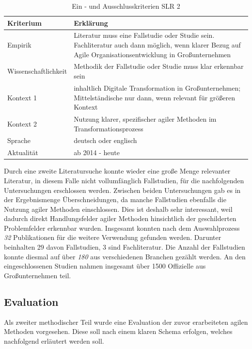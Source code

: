 \begin{table}[ht]
	\centering
	\caption{Ein - und Ausschlusskriterien SLR 2}
	\begin{tabular}{|p{4cm}|p{8cm}|}
		\hline
		\textbf{Kriterium}& \textbf{Erklärung}  \\
		\hline
		Empirik & Literatur muss eine Fallstudie oder Studie sein. Fachliteratur auch dann möglich, wenn klarer Bezug auf Agile Organisationsentwicklung in Großunternehmen \\
		Wissenschaftlichkeit & Methodik der  Fallstudie oder Studie muss klar erkennbar sein \\
		Kontext 1 & inhaltlich Digitale Transformation in Großunternehmen; Mittelständische nur dann, wenn relevant für größeren Kontext \\
		Kontext 2 & Nutzung klarer, spezifischer agiler Methoden im Transformationsprozess \\
		Sprache & deutsch oder englisch \\
		Aktualität & ab 2014 - heute  \\
		\hline
	\end{tabular}
	\label{tab:criteriaslr2}
\end{table}

Durch eine zweite Literatursuche konnte wieder eine große Menge relevanter Literatur, in diesem Falle nicht vollumfänglich Fallstudien, für die nachfolgenden Untersuchungen erschlossen werden. Zwischen beiden Untersuchungen gab es in der Ergebnismenge Überschneidungen, da manche Fallstudien ebenfalls die Nutzung agiler Methoden einschlossen. Dies ist deshalb sehr interessant, weil dadurch direkt Handlungsfelder agiler Methoden hinsichtlich der geschilderten Problemfelder erkennbar wurden. Insgesamt konnten nach dem Auswahlprozess \textit{32} Publikationen für die weitere Verwendung gefunden werden. Darunter beinhalten 29 davon Fallstudien, 3 sind Fachliteratur. Die Anzahl der Fallstudien konnte diesmal auf über \textit{180} aus verschiedenen Branchen gezählt werden. An den eingeschlossenen Studien nahmen insgesamt über 1500 Offizielle aus Großunternehmen teil. 

\subsection{Evaluation}
\label{agilepractices:evaluationschema}

Als zweiter methodischer Teil wurde eine Evaluation der zuvor erarbeiteten agilen Methoden vorgesehen. Diese soll nach einem klaren Schema erfolgen, welches nachfolgend erläutert werden soll. 

